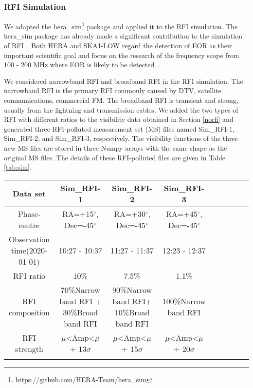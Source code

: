 \documentclass[usenatbib]{mnras}
\begin{document}
\subsubsection{RFI Simulation}
\label{rfi}


We adapted the hera\_sim\footnote{https://github.com/HERA-Team/hera\_sim} package and applied it to the RFI simulation.
The hera\_sim package has already made a significant contribution to the simulation of RFI~\citep{kerrigan2019optimizing}. Both HERA and SKA1-LOW regard the detection of EOR as their important scientific goal and focus on the research of the frequency scope from 100 - 200 MHz where EOR is likely to be detected~\citep{de2018antenna,thyagarajan2017status}. 

We considered narrowband RFI and broadband RFI in the RFI simulation. The narrowband RFI is the primary RFI commonly caused by DTV, satellite communications, commercial FM. The broadband RFI is transient and strong, usually from the lightning and transmission cables. We added the two types of RFI with different ratios to the visibility data obtained in Section \ref{norfi} and generated three RFI-polluted measurement set (MS) files named Sim\_RFI-1, Sim\_RFI-2, and Sim\_RFI-3, respectively. The visibility functions of the three new MS files are stored in three Numpy arrays with the same shape as the original MS files. The details of these RFI-polluted files are given in Table \ref{tab:sim}. 

\begin{table*}
\centering

\caption{The information of the RFI-polluted data. Amp represents the amplitude of the RFI, the $\mu$ and $\sigma$ represent the mean and standard deviation of the overall data.}
\begin{tabular}{ccccccccc}
\toprule
Data set &  Sim\_RFI-1 & Sim\_RFI-2 & Sim\_RFI-3\\
\midrule
Phase-centre &RA=+15$^\circ$, Dec=-45$^\circ$ & RA=+30$^\circ$, Dec=-45$^\circ$ & RA=+45$^\circ$, Dec=-45$^\circ$\\
Observation time(2020-01-01) &  10:27 -  10:37 &  11:27 -  11:37 & 12:23 - 12:37   \\
RFI ratio & 10\% & 7.5\% & 1.1\% \\
RFI composition & 70\%Narrow band RFI + 30\%Broad band RFI  & 90\%Narrow band RFI+ 10\%Broad band RFI & 100\%Narrow band RFI \\
RFI strength &  $\mu$<Amp<$\mu$ + 13$\sigma$& $\mu$<Amp<$\mu$ + 15$\sigma$ & $\mu$<Amp<$\mu$ + 20$\sigma$\\

\bottomrule
\label{tab:sim}
\end{tabular}
\end{table*}
\end{document}
